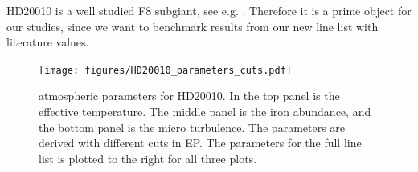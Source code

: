\documentclass{aa}
\begin{document}
HD20010 is a well studied F8 subgiant, see e.g.
\cite{Mortier2013,lebzelter2012}. Therefore it is a prime object for our
studies, since we want to benchmark results from our new line list with
literature values.



\begin{figure}[htpb]
    \centering
    \texttt{[image: figures/HD20010\_parameters\_cuts.pdf]}
    \caption{atmospheric parameters for HD20010. In the top panel is the
    effective temperature. The middle panel is the iron abundance, and the
    bottom panel is the micro turbulence. The parameters are derived with
    different cuts in EP. The parameters for the full line list is plotted
    to the right for all three plots.}
    \label{fig:HD20010_parameters_cuts}
\end{figure}











\newpage


\nocite*{}
\end{document}
